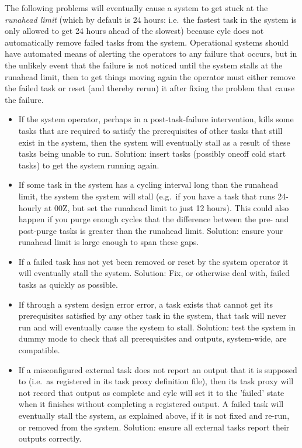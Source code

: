 \documentclass[11pt,a4paper]{article}
\begin{document}
The following problems will eventually cause a system to get stuck at
the {\em runahead limit} (which by default is 24 hours: i.e.\ the
fastest task in the system is only allowed to get 24 hours ahead of the
slowest) because cylc does not automatically remove failed tasks from
the system.  Operational systems should have automated means of
alerting the operators to any failure that occurs, but in the
unlikely event that the failure is not noticed until the system stalls
at the runahead limit, then to get things moving again the operator must
either remove the failed task or reset (and thereby rerun) it after
fixing the problem that cause the failure.

\begin{itemize}
    \item If the system operator, perhaps in a post-task-failure
    intervention, kills some tasks that are required to satisfy the
    prerequisites of other tasks that still exist in the system, then 
    the system will eventually stall as a result of these tasks being
    unable to run. Solution: insert tasks (possibly oneoff cold start
    tasks) to get the system running again.

    \item If some task in the system has a cycling interval long than
        the runahead limit, the system the system will stall (e.g.\ if
    you have a task that runs 24-hourly at 00Z, but set the runahead
    limit to just 12 hours). This could also happen if you purge enough
    cycles that the difference between the pre- and post-purge tasks
    is greater than the runahead limit. Solution: ensure your runahead
    limit is large enough to span these gaps.

    \item If a failed task has not yet been removed or reset by the
    system operator it will eventually stall the system. Solution:
    Fix, or otherwise deal with, failed tasks as quickly as possible.

    \item If through a system design error error, a task exists that
        cannot get its prerequisites satisfied by any other task in the
        system, that task will never run and will eventually cause the
        system to stall.  Solution: test the system in dummy mode to 
        check that all prerequisites and outputs, system-wide, are 
        compatible.

    \item If a misconfigured external task does not report an output
        that it is supposed to (i.e.\ as registered in its task proxy
        definition file), then its task proxy will not record that 
        output as complete and cylc will set it to the 'failed' state
        when it finishes without completing a registered output. A
        failed task will eventually stall the system, as explained above, 
        if it is not fixed and re-run, or removed from the system.
        Solution: ensure all external tasks report their outputs
        correctly.

\end{itemize}
\end{document}
